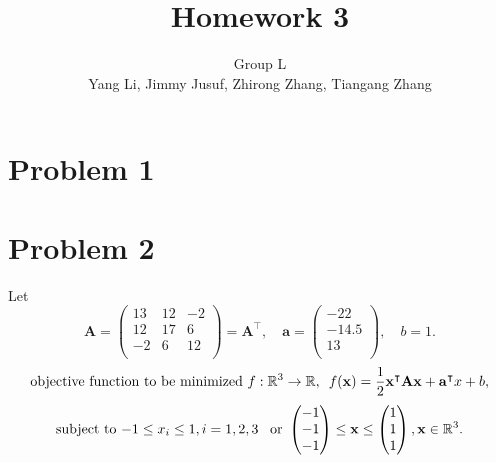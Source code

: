 \documentclass[fleqn]{article}
\title{Homework 3}
\author{Group L\\
Yang Li, Jimmy Jusuf, Zhirong Zhang, Tiangang Zhang}
\newcommand{\mat}[1]{\mathbf{#1}}
\newcommand{\tr}{^\intercal}
\newcommand{\real}{\mathbb{R}}
\begin{document}
\maketitle


\section{Problem 1}

\section{Problem 2}

Let
\begin{equation}
\mat A = \begin{pmatrix}
  13 & 12 & -2 \\
  12 & 17 & 6 \\
  -2 & 6 & 12 \\
  \end{pmatrix} = \mat A\tr,\quad 
\mat a = \begin{pmatrix} -22 \\ -14.5 \\ 13 \\ \end{pmatrix},\quad
b = 1.
\end{equation}
\begin{equation}
\textnormal{objective function to be minimized }f:\real^3\rightarrow\real,
\enskip f(\mat x)=\frac12 \mat x\tr \mat A \mat x + \mat a\tr x + b,
\end{equation}
\begin{equation}\label{eq3}
\textnormal{subject to } {-1}\leq x_i\leq 1, i=1,2,3
\enskip\textnormal{ or } \begin{pmatrix} -1\\-1\\-1 \end{pmatrix}
  \leq \mat x\leq \begin{pmatrix} 1\\1\\1 \end{pmatrix},
  \mat x\in\real^3.
\end{equation}
\end{document}
